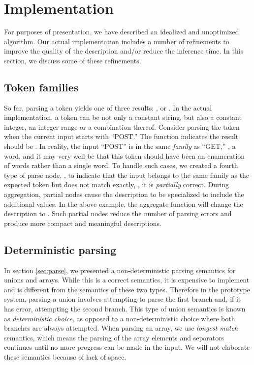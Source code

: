 \section{Implementation}\label{sec:imp}

For purposes of presentation, we have described an idealized and
unoptimized algorithm.  Our actual implementation includes a number of
refinements to improve the quality of the description and/or reduce the
inference time.  In this section, we discuss some of these refinements.

\subsection{Token families}
So far, parsing a  token yields
one of three results: ,  or . 
In the actual implementation, a  token can be not only a constant string, but also
a constant integer, an integer range or a combination thereof.
Consider parsing the token  when
the current input starts with ``POST.'' The
 function indicates the result should be .
In reality, the input ``POST'' is in the same {\em family} as ``GET,'' 
\ie{}, a word,
and it may very well be that this  token should have been 
an enumeration of words rather than a single word.
To handle such cases, we created a fourth type of parse node, , 
to indicate that the input belongs to the same family as the expected
token but does not match exactly, \ie, it is {\em partially} correct.
During aggregation, partial nodes cause the description 
to be specialized to include the additional values.  In the above example, the aggregate 
function will change the description to .
Such partial nodes reduce the number of parsing errors
and produce more compact and meaningful descriptions.

\subsection{Deterministic parsing}
In section \ref{sec:parse}, we presented a non-deterministic parsing semantics
for unions and arrays. While this is a correct semantics, it is expensive
to implement and is different from the \pads{} semantics of these two 
types.
Therefore in the prototype system, parsing a union involves 
attempting to parse the first branch and,
if it has error, attempting the second branch. This type of union semantics
is known as {\em deterministic choice}, as opposed to a non-deterministic
choice where both branches are always attempted.
When parsing an array, we use {\em longest match} semantics,
which means the parsing of the array elements and separators
continues until no more progress can be made in
the input. We will not elaborate these semantics because of lack of space.

